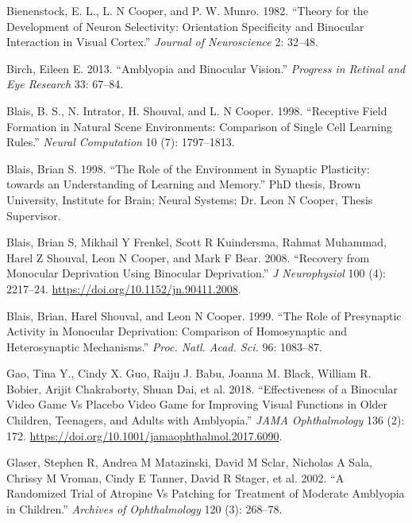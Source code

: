 \documentclass[
  letterpaper,
  DIV=11,
  numbers=noendperiod]{scrreprt}
\newlength{\cslhangindent}
\newlength{\cslentryspacingunit} %
\newenvironment{CSLReferences}[2] %
 {%
  \setlength{\parindent}{0pt}
  \ifodd #1
  \let\oldpar\par
  \def\par{\hangindent=\cslhangindent\oldpar}
  \fi
  \setlength{\parskip}{#2\cslentryspacingunit}
 }%
 {}
\begin{document}
\hypertarget{refs}{}
\begin{CSLReferences}{1}{0}
\leavevmode{}%
Bienenstock, E. L., L. N Cooper, and P. W. Munro. 1982. {``Theory for
the Development of Neuron Selectivity: Orientation Specificity and
Binocular Interaction in Visual Cortex.''} \emph{Journal of
Neuroscience} 2: 32--48.

\leavevmode{}%
Birch, Eileen E. 2013. {``Amblyopia and Binocular Vision.''}
\emph{Progress in Retinal and Eye Research} 33: 67--84.

\leavevmode{}%
Blais, B. S., N. Intrator, H. Shouval, and L. N Cooper. 1998.
{``Receptive Field Formation in Natural Scene Environments: Comparison
of Single Cell Learning Rules.''} \emph{Neural Computation} 10 (7):
1797--1813.

\leavevmode{}%
Blais, Brian S. 1998. {``The Role of the Environment in Synaptic
Plasticity:\\
towards an Understanding of Learning and Memory.''} PhD thesis, Brown
University, Institute for Brain; Neural Systems; Dr. Leon N Cooper,
Thesis Supervisor.

\leavevmode{}%
Blais, Brian S, Mikhail Y Frenkel, Scott R Kuindersma, Rahmat Muhammad,
Harel Z Shouval, Leon N Cooper, and Mark F Bear. 2008. {``Recovery from
Monocular Deprivation Using Binocular Deprivation.''} \emph{J
Neurophysiol} 100 (4): 2217--24.
\url{https://doi.org/10.1152/jn.90411.2008}.

\leavevmode{}%
Blais, Brian, Harel Shouval, and Leon N Cooper. 1999. {``The Role of
Presynaptic Activity in Monocular Deprivation: Comparison of
Homosynaptic and Heterosynaptic Mechanisms.''} \emph{Proc. Natl. Acad.
Sci.} 96: 1083--87.

\leavevmode{}%
Gao, Tina Y., Cindy X. Guo, Raiju J. Babu, Joanna M. Black, William R.
Bobier, Arijit Chakraborty, Shuan Dai, et al. 2018. {``Effectiveness of
a Binocular Video Game Vs Placebo Video Game for Improving Visual
Functions in Older Children, Teenagers, and Adults with Amblyopia.''}
\emph{JAMA Ophthalmology} 136 (2): 172.
\url{https://doi.org/10.1001/jamaophthalmol.2017.6090}.

\leavevmode{}%
Glaser, Stephen R, Andrea M Matazinski, David M Sclar, Nicholas A Sala,
Chrissy M Vroman, Cindy E Tanner, David R Stager, et al. 2002. {``A
Randomized Trial of Atropine Vs Patching for Treatment of Moderate
Amblyopia in Children.''} \emph{Archives of Ophthalmology} 120 (3):
268--78.


\end{CSLReferences}
\end{document}
